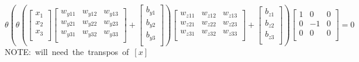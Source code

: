 \documentclass{article}
\begin{document}
\[
\theta(
    \theta(
\begin{bmatrix}   
    x_1\\
    x_2\\
    x_3\\
    \end{bmatrix}
\begin{bmatrix}
    w_{y11} & w_{y12} & w_{y13}\\
    w_{y21} & w_{y22} & w_{y23}\\
    w_{y31} & w_{y32} & w_{y33}\\
\end{bmatrix}
    +
\begin{bmatrix}
    b_{y1}\\
    b_{y2}\\
    b_{y3}\\
\end{bmatrix}
    )
\begin{bmatrix}
    w_{z11} & w_{z12} & w_{z13}\\
    w_{z21} & w_{z22} & w_{z23}\\
    w_{z31} & w_{z32} & w_{z33}\\
\end{bmatrix}
    +
\begin{bmatrix}
    b_{z1}\\
    b_{z2}\\
    b_{z3}\\
\end{bmatrix}
)
%
\begin{bmatrix}   
    1 & 0 & 0 \\
    0 & -1 & 0 \\
    0 & 0 & 0 \\
    \end{bmatrix} 
%
    = 0
\]
\hbox{NOTE: will need the transpos of $[x]$}
\end{document}
